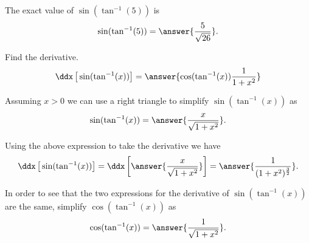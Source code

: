 \documentclass{ximera}
\author{Nela Lakos \and Kyle Parsons}
\begin{document}
\begin{exercise}

The exact value of $\sin(\tan^{-1}(5))$ is
\[
\sin(\tan^{-1}(5)) = \answer{\frac{5}{\sqrt{26}}}.
\]

Find the derivative.
\[
\ddx\left[\vphantom{\ddx}\sin(\tan^{-1}(x))\right] = \answer{\cos(\tan^{-1}(x))\frac{1}{1+x^2}}
\]

Assuming $x>0$ we can use a right triangle to simplify $\sin(\tan^{-1}(x))$ as
\[
\sin(\tan^{-1}(x)) = \answer{\frac{x}{\sqrt{1+x^2}}}.
\]

Using the above expression to take the derivative we have
\[
\ddx\left[\vphantom{\ddx}\sin(\tan^{-1}(x))\right] = \ddx\left[\vphantom{\ddx}\answer{\frac{x}{\sqrt{1+x^2}}}\right] = \answer{\frac{1}{(1+x^2)^{\frac{3}{2}}}}.
\]

In order to see that the two expressions for the derivative of $\sin(\tan^{-1}(x))$ are the same, simplify $\cos(\tan^{-1}(x))$ as
\[
\cos(\tan^{-1}(x)) = \answer{\frac{1}{\sqrt{1+x^2}}}.
\]

\end{exercise}
\end{document}
